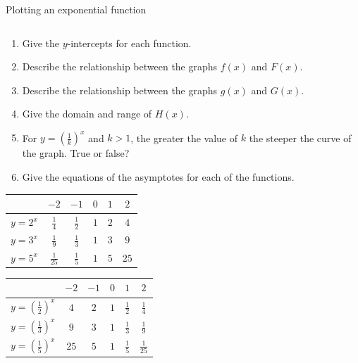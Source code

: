 \begin{wex}{Plotting an exponential function}
{\begin{table}[H]
\begin{center}
\begin{tabular}{|c|c|c|c|c|c|}
\end{tabular}
\end{center}
\end{table}

\begin{enumerate}[noitemsep, label=\textbf{\arabic*}. ] 
 \item Give the $y$-intercepts for each function.
\item Describe the relationship between the graphs $f(x)$ and $F(x)$.
\item Describe the relationship between the graphs $g(x)$ and $G(x)$.
\item Give the domain and range of $H(x)$.
\item For $y=(\frac{1}{k})^{x}$ and $k>1$, the greater the value of $k$ the steeper the curve of the graph. True or false?
\item Give the equations of the asymptotes for each of the functions.
\end{enumerate}

}
{
\begin{table}[H]
\begin{center}
\begin{tabular}{|c|c|c|c|c|c|}
\hline
   &  $-2$ & $-1$ & $0$ & $1$ & $2$ 
\\ \hline
 $y=2^{x}$& $\frac{1}{4}$ &$\frac{1}{2}$&$1$&$2$&$4$
\\ \hline
 $y=3^{x}$& $\frac{1}{9}$ &$\frac{1}{3}$&$1$&$3$&$9$
\\ \hline
 $y=5^{x}$& $\frac{1}{25}$ &$\frac{1}{5}$&$1$&$5$&$25$
\\ \hline

\end{tabular}
\end{center}
\end{table}

\begin{table}[H]
\begin{center}
\begin{tabular}{|c|c|c|c|c|c|}
\hline
   &  $-2$ & $-1$ & $0$ & $1$ & $2$ 
\\ \hline
 $y=(\frac{1}{2})^{x}$& $4$ &$2$&$1$&$\frac{1}{2}$&$\frac{1}{4}$
\\ \hline
$y=(\frac{1}{3})^{x}$&  $9$&$3$&$1$&$\frac{1}{3}$&$\frac{1}{9}$
\\ \hline
$y=(\frac{1}{5})^{x}$& $25$& $5$&$1$&$\frac{1}{5}$&$\frac{1}{25}$
\\ \hline

\end{tabular}
\end{center}
\end{table}
\westep{}
}
\end{wex}

